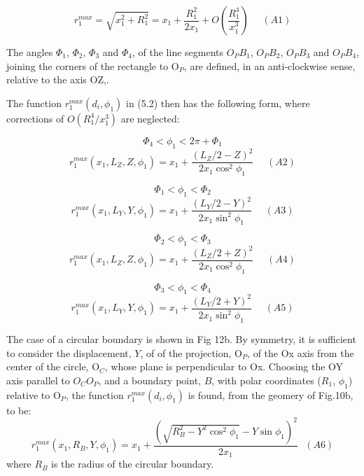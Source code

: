 \documentclass [12pt]{article}
\begin{document}
{  \[ r_1^{max} = \sqrt{x_1^2 + R_1^2} = x_1 + \frac{R_1^2}{2 x_1} + O(\frac{R_1^4}{x_1^3})~~~~~~(A1)\]

 The angles $\Phi_1$, $\Phi_2$, $\Phi_3$ and $\Phi_4$, of the line segments $O_P B_1$, $O_P B_2$,
  $O_P B_3$ and  $O_P B_4$, joining the corners of the rectangle to O$_P$, are 
  defined, in an anti-clockwise sense, relative to the axis OZ,.
 \par The function $r_1^{max}(d_i, \phi_1)$ in (5.2) then has the following form,
  where corrections of $ O(R_1^4/x_1^3)$ are neglected:
  \par
  \[\Phi_4 < \phi_1 < 2\pi +\Phi_1\]
  \[ r_1^{max}(x_1,L_Z,Z, \phi_1) = x_1 + \frac{(L_Z/2-Z)^2}{2 x_1 \cos^2 \phi_1}~~~~~~(A2)\]       
    \par
  \[\Phi_1 < \phi_1 < \Phi_2\]
  \[ r_1^{max}(x_1,L_Y,Y, \phi_1) = x_1 + \frac{(L_Y/2-Y)^2}{2 x_1 \sin^2 \phi_1}~~~~~~(A3)\]
      \par
  \[\Phi_2 < \phi_1 < \Phi_3\]
  \[ r_1^{max}(x_1,L_Z,Z, \phi_1) = x_1 + \frac{(L_Z/2+Z)^2}{2 x_1 \cos^2 \phi_1}~~~~~~(A4)\]
        \par
  \[\Phi_3 < \phi_1 < \Phi_4\]
  \[ r_1^{max}(x_1,L_Y,Y, \phi_1) = x_1 + \frac{(L_Y/2+Y)^2}{2 x_1 \sin^2 \phi_1}~~~~~~(A5)\] 
  
  \par The case of a circular boundary is shown in Fig 12b. By symmetry, it is sufficient to consider
   the displacement, $Y$, of of the projection, O$_P$, of the Ox axis from the center of the circle, O$_C$,
   whose plane is perpendicular to Ox. Choosing the OY axis parallel to  $O_C O_P$, and a 
  boundary point, $B$, with polar coordinates ($R_1$, $\phi_1$) relative to O$_P$, the function 
  $r_1^{max}(d_i, \phi_1)$ is
   found, from the geomery of Fig.10b, to be:
  \[  r_1^{max}(x_1,R_B,Y,\phi_1) = x_1 + \frac{(\sqrt{R_B^2-Y^2 \cos^2 \phi_1}-Y \sin\phi_1)^2}{2 x_1}~~~(A6)\]
    where $R_B$ is the radius of the circular boundary.\

}
\end{document}
